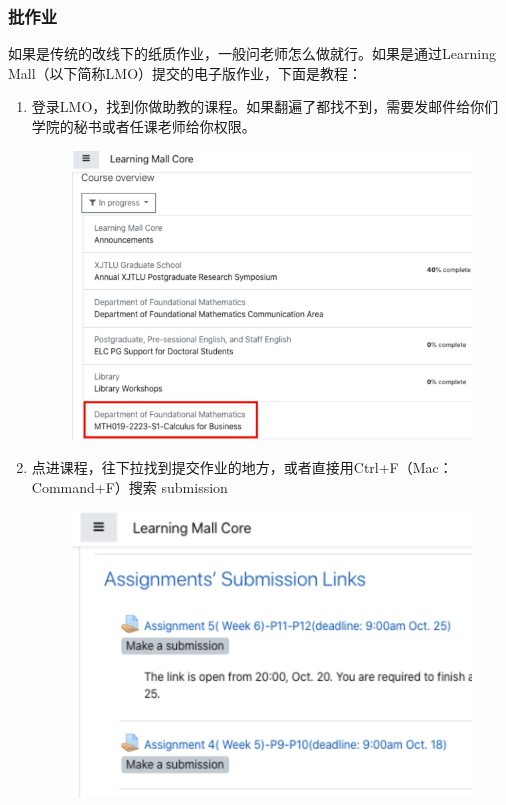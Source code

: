 \subsubsection{批作业}
如果是传统的改线下的纸质作业，一般问老师怎么做就行。如果是通过Learning Mall（以下简称LMO）提交的电子版作业，下面是教程：
\begin{enumerate}
    \item 登录LMO，找到你做助教的课程。如果翻遍了都找不到，需要发邮件给你们学院的秘书或者任课老师给你权限。
    \begin{figure}[H]
        \centering
        \includegraphics[width=0.4\columnwidth]{author-folder/Kai.Wu/LMO_course.png}
    \end{figure}

    \item 
    \begin{minipage}{0.3\textwidth}
        点进课程，往下拉找到提交作业的地方，或者直接用Ctrl+F（Mac：Command+F）搜索 submission
    \end{minipage}
    \begin{minipage}{0.63\textwidth}
        \begin{figure}[H]
            \includegraphics[width=0.95\columnwidth, right]{author-folder/Kai.Wu/LMO_submission_links.png}
        \end{figure}
    \end{minipage}


\end{enumerate}
